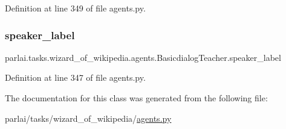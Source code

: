 Definition at line 349 of file agents.\+py.

\mbox{\label{classparlai_1_1tasks_1_1wizard__of__wikipedia_1_1agents_1_1BasicdialogTeacher_aacc71f8c41cd2a67481e19e2d7bcdd6e}} 
\subsubsection{\texorpdfstring{speaker\+\_\+label}{speaker\_label}}
{\footnotesize\ttfamily parlai.\+tasks.\+wizard\+\_\+of\+\_\+wikipedia.\+agents.\+Basicdialog\+Teacher.\+speaker\+\_\+label}



Definition at line 347 of file agents.\+py.



The documentation for this class was generated from the following file\+:\begin{DoxyCompactItemize}
\item 
parlai/tasks/wizard\+\_\+of\+\_\+wikipedia/\hyperlink{parlai_2tasks_2wizard__of__wikipedia_2agents_8py}{agents.\+py}\end{DoxyCompactItemize}
